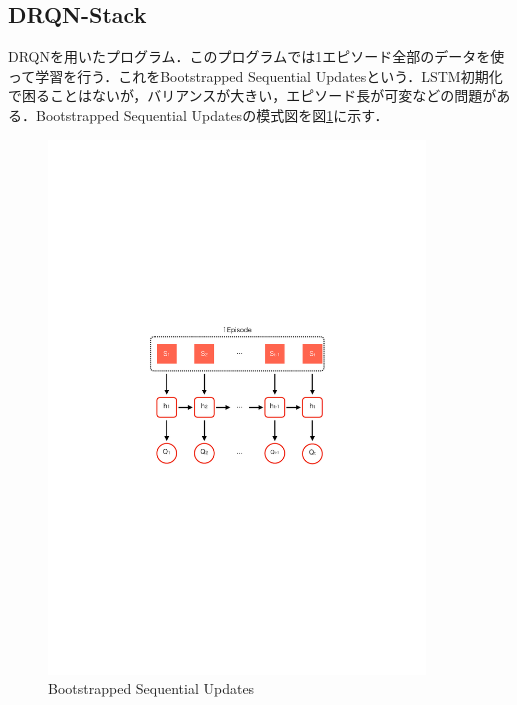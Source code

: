 \documentclass{eithesis}
\begin{document}
    \subsection{DRQN-Stack}
      DRQNを用いたプログラム．このプログラムでは1エピソード全部のデータを使って学習を行う．これをBootstrapped Sequential Updatesという．LSTM初期化で困ることはないが，バリアンスが大きい，エピソード長が可変などの問題がある．Bootstrapped Sequential Updatesの模式図を図\ref{fig_sequential}に示す．
      \begin{figure}[htbp]
        \centering
        \includegraphics[width=10cm]{./images/sequential.pdf}
        \caption{Bootstrapped Sequential Updates}
        \label{fig_sequential}
      \end{figure}
\end{document}
